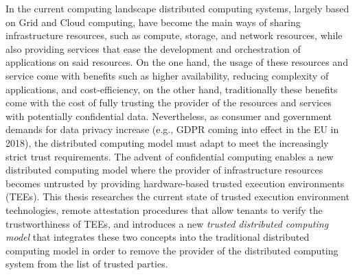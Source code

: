 
\Abstract

In the current computing landscape distributed computing systems, largely based
on Grid and Cloud computing, have become the main ways of sharing infrastructure
resources, such as compute, storage, and network resources, while also providing
services that ease the development and orchestration of applications on said
resources. On the one hand, the usage of these resources and service come with
benefits such as higher availability, reducing complexity of applications, and
cost-efficiency, on the other hand, traditionally these benefits come with the
cost of fully trusting the provider of the resources and services with
potentially confidential data. Nevertheless, as consumer and government demands
for data privacy increase (e.g., GDPR coming into effect in the EU in 2018), the
distributed computing model must adapt to meet the increasingly strict trust
requirements. The advent of confidential computing enables a new distributed
computing model where the provider of infrastructure resources becomes untrusted
by providing hardware-based trusted execution environments (TEEs). This thesis
researches the current state of trusted execution environment technologies,
remote attestation procedures that allow tenants to verify the trustworthiness
of TEEs, and introduces a new \textit{trusted distributed computing model} that
integrates these two concepts into the traditional distributed computing model
in order to remove the provider of the distributed computing system from the
list of trusted parties.
